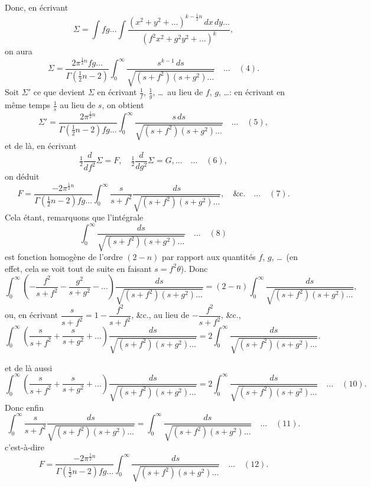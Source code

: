 \documentclass[11pt]{article}
\begin{document}
\medskip
Donc, en \'ecrivant
\[
\Sigma = \int fg\ldots\int\frac{(x^{2} + y^{2} + \ldots)^{k - \tfrac{1}{2}n}\,dx\,dy\ldots}{(f^{2}x^{2} + g^{2}y^{2} + \ldots)^{k}},
\]
on aura
\[
\Sigma = \frac{2\pi^{\tfrac{1}{2}n}fg\ldots}{\Gamma(\tfrac{1}{2}n - 2)}\int_{0}^{\infty}\frac{s^{k - 1}\,ds}{\sqrt{(s + f^{2})(s + g^{2})\ldots}}\quad\ldots\quad (4).
\]
Soit $\Sigma'$ ce que devient $\Sigma$ en \'ecrivant $\tfrac{1}{f}$, $\tfrac{1}{g}$, \ldots\ au lieu de $f$, $g$, \ldots: en \'ecrivant en m\^eme
temps $\tfrac{1}{s}$ au lieu de $s$, on obtient
\[
\Sigma' = \frac{2\pi^{\tfrac{1}{2}n}}{\Gamma(\tfrac{1}{2}n - 2)fg\ldots}\int_{0}^{\infty}\frac{s\,ds}{\sqrt{(s + f^{2})(s + g^{2})\ldots}}\quad\ldots\quad (5),
\]
et de l\`a, en \'ecrivant
\[
\tfrac{1}{2}\frac{d}{df^{2}}\Sigma = F,\quad \tfrac{1}{2}\frac{d}{dg^{2}}\Sigma = G,\ldots\quad\ldots\quad (6),
\]
on d\'eduit
\[
F = \frac{-2\pi^{\tfrac{1}{2}n}}{\Gamma(\tfrac{1}{2}n - 2)fg\ldots}\int_{0}^{\infty}\frac{s}{s + f^{2}}\frac{ds}{\sqrt{(s + f^{2})(s + g^{2})\ldots}},\quad \&\text{c.}\quad\ldots\quad (7).
\]
Cela \'etant, remarquons que l'int\'egrale
\[
\int_{0}^{\infty}\frac{ds}{\sqrt{(s + f^{2})(s + g^{2})\ldots}}\quad\ldots\quad (8)
\]
est fonction homog\`ene de l'ordre $(2 - n)$ par rapport aux quantit\'es $f$, $g$, \ldots\ (en effet, cela
se voit tout de suite en faisant $s = f^{2}\theta$). Donc
\[
\int_{0}^{\infty}\!\left(-\frac{f^{2}}{s + f^{2}} - \frac{g^{2}}{s + g^{2}} - \ldots\right)\frac{ds}{\sqrt{(s + f^{2})(s + g^{2})\ldots}} = (2 - n)\int_{0}^{\infty}\frac{ds}{\sqrt{(s + f^{2})(s + g^{2})\ldots}},
\]
ou, en \'ecrivant $\dfrac{s}{s + f^{2}} = 1 - \dfrac{f^{2}}{s + f^{2}}$, \&c., au lieu de $-\dfrac{f^{2}}{s + f^{2}}$, \&c.,
\[
\int_{0}^{\infty}\!\left(\frac{s}{s + f^{2}} + \frac{s}{s + g^{2}} + \ldots\right)\frac{ds}{\sqrt{(s + f^{2})(s + g^{2})\ldots}} = 2\int_{0}^{\infty}\frac{ds}{\sqrt{(s + f^{2})(s + g^{2})\ldots}}.
\]


et de l\`a aussi
\[
\int_{0}^{\infty}\!\left(\frac{s}{s + f^{2}} + \frac{s}{s + g^{2}} + \ldots\right)\frac{ds}{\sqrt{(s + f^{2})(s + g^{2})\ldots}} = 2\int_{0}^{\infty}\frac{ds}{\sqrt{(s + f^{2})(s + g^{2})\ldots}}\quad\ldots\quad (10).
\]
Donc enfin
\[
\int_{0}^{\infty}\frac{s}{s + f^{2}}\frac{ds}{\sqrt{(s + f^{2})(s + g^{2})\ldots}} = \int_{0}^{\infty}\frac{ds}{\sqrt{(s + f^{2})(s + g^{2})\ldots}}\quad\ldots\quad (11).
\]
c'est-\`a-dire
\[
F = \frac{-2\pi^{\tfrac{1}{2}n}}{\Gamma(\tfrac{1}{2}n - 2)fg\ldots}\int_{0}^{\infty}\frac{ds}{\sqrt{(s + f^{2})(s + g^{2})\ldots}}\quad\ldots\quad (12).
\]
\end{document}

